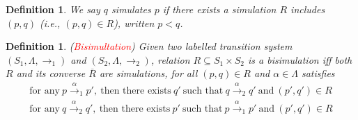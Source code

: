 \documentclass{article}
\newtheorem{lemma}[theorem]{Lemma}
\newtheorem{definition}[theorem]{Definition}
\newcommand{\redt}[1]{\textcolor{red}{#1}}
\begin{document}
\begin{definition}
\rm We say $q$ simulates $p$ if there exists a simulation $R$ includes $(p,q)$ (i.e., $(p,q) \in R$), written $p < q$.
\end{definition}



\begin{definition}
\rm (\redt{Bisimultation}) Given two labelled transition system $(S_1, \Lambda, \to_1)$ and $(S_2, \Lambda, \to_2)$, relation $R \subseteq S_1 \times S_2$ is a bisimulation iff both $R$ and its converse $\overline{R}$ are simulations, for all $(p,q) \in R$ and $\alpha \in \Lambda$ satisfies
\[
	\begin{gathered}
	\text{for any}~p \xrightarrow{\alpha}_1 p', ~\text{then there exists}~ q'~\text{such that}~q \xrightarrow{\alpha}_2 q'~\text{and}~(p',q') \in R \\
	\text{for any}~q \xrightarrow{\alpha}_2 q', ~\text{then there exists}~ p'~\text{such that}~p \xrightarrow{\alpha}_1 p'~\text{and}~(p',q') \in R
	\end{gathered} 	
\]
\end{definition}

\end{document}
